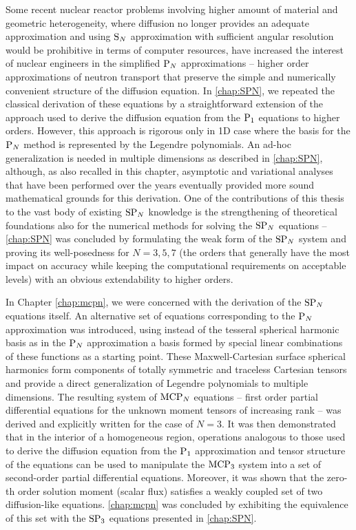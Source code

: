 \documentclass[twoside, 12pt]{thesis}
\begin{document}
Some recent nuclear reactor problems involving higher amount of material and geometric heterogeneity, where diffusion no
longer provides an adequate approximation and using $\SN$ approximation with sufficient angular resolution would be
prohibitive in terms of computer resources, have increased the interest of nuclear engineers in the simplified $\PN$
approximations -- higher order approximations of neutron transport that preserve the simple and numerically convenient
structure of the diffusion equation. In \cref{chap:SPN}, we repeated the classical derivation of these equations by a
straightforward extension of the approach used to derive the diffusion equation from the $\PN[1]$ equations to higher
orders. However, this approach is rigorous only in 1D case where the basis for the $\PN$ method is represented by the
Legendre polynomials. An ad-hoc generalization is needed in multiple dimensions as described in \cref{chap:SPN}, 
although, as also recalled in this chapter, asymptotic and variational analyses that have been performed over the
years eventually provided more sound mathematical grounds for this derivation. One of the contributions of this thesis
to the vast body of existing $\SPN$ knowledge is the strengthening of theoretical foundations also for the numerical
methods for solving the $\SPN$ equations -- \cref{chap:SPN} was concluded by formulating the weak form of the $\SPN$
system and proving its well-posedness for $N = 3,5,7$ (the orders that generally have the most impact on
accuracy while keeping the computational requirements on acceptable levels) with an obvious extendability to higher
orders.

In Chapter \ref{chap:mcpn}, we were concerned with the derivation of the $\SPN$ equations itself. An alternative set of
equations corresponding to the $\PN$ approximation was introduced, using instead of the tesseral spherical harmonic
basis as in the $\PN$ approximation a basis formed by special linear combinations of these functions  as a starting
point. These Maxwell-Cartesian surface spherical harmonics form components of totally symmetric and traceless Cartesian
tensors and provide a direct generalization of Legendre polynomials to multiple dimensions. The resulting system of
$\MCPN$ equations -- first order partial differential equations for the unknown moment tensors of increasing rank -- was
derived and explicitly written for the case of $N = 3$. It was then demonstrated that in the interior of a homogeneous
region, operations analogous to those used to derive the diffusion equation from the $\PN[1]$ approximation and
tensor structure of the equations can be used to manipulate the $\MCPN[3]$ system into a set of
second-order partial differential equations. Moreover, it was shown that the zero-th order solution moment (scalar flux)
satisfies a weakly coupled set of two diffusion-like equations. \cref{chap:mcpn} was concluded by exhibiting the
equivalence of this set with the $\SPN[3]$ equations presented in \cref{chap:SPN}.
\end{document}
